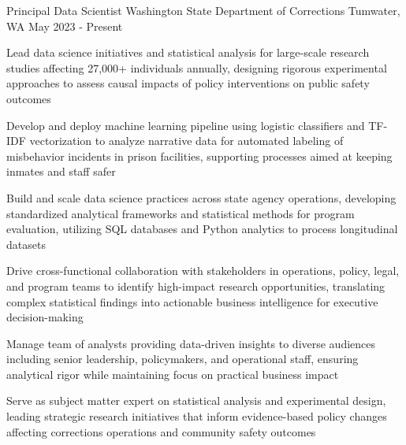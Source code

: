 

\begin{cventries}

  \cventry
  {Principal Data Scientist}
  {Washington State Department of Corrections}
  {Tumwater, WA}
  {May 2023 - Present}
  {
    \begin{cvitems}
      \vspace{2mm}
      \item Lead data science initiatives and statistical analysis for large-scale research studies affecting 27,000+ individuals annually, designing rigorous experimental approaches to assess causal impacts of policy interventions on public safety outcomes
      \item Develop and deploy machine learning pipeline using logistic classifiers and TF-IDF vectorization to analyze narrative data for automated labeling of misbehavior incidents in prison facilities, supporting processes aimed at keeping inmates and staff safer
      \item Build and scale data science practices across state agency operations, developing standardized analytical frameworks and statistical methods for program evaluation, utilizing SQL databases and Python analytics to process longitudinal datasets
      \item Drive cross-functional collaboration with stakeholders in operations, policy, legal, and program teams to identify high-impact research opportunities, translating complex statistical findings into actionable business intelligence for executive decision-making
      \item Manage team of analysts providing data-driven insights to diverse audiences including senior leadership, policymakers, and operational staff, ensuring analytical rigor while maintaining focus on practical business impact
      \item Serve as subject matter expert on statistical analysis and experimental design, leading strategic research initiatives that inform evidence-based policy changes affecting corrections operations and community safety outcomes
    \end{cvitems}
}
\end{cventries}
